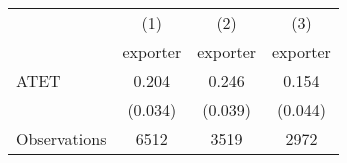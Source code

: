 \begin{tabular}{l*{3}{c}}
\hline\hline
                    &\multicolumn{1}{c}{(1)}&\multicolumn{1}{c}{(2)}&\multicolumn{1}{c}{(3)}\\
                    &\multicolumn{1}{c}{exporter}&\multicolumn{1}{c}{exporter}&\multicolumn{1}{c}{exporter}\\
\hline
ATET                &       0.204&       0.246&       0.154\\
                    &     (0.034)&     (0.039)&     (0.044)\\
\hline
Observations        &        6512&        3519&        2972\\
\hline\hline
\end{tabular}
